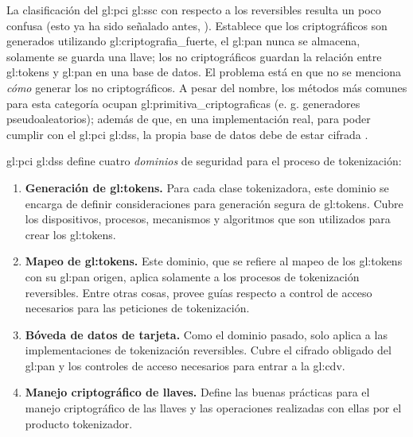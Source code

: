 La clasificación del \gls{gl:pci} \gls{gl:ssc} con respecto a los reversibles
resulta un poco confusa (esto ya ha sido señalado antes, \cite{doc_sandra}).
Establece que los criptográficos son generados utilizando
\gls{gl:criptografia_fuerte}, el \gls{gl:pan} nunca se almacena, solamente se
guarda una llave; los no criptográficos guardan la relación entre
\glspl{gl:token} y \gls{gl:pan} en una base de datos. El problema está en que
no se menciona \textit{cómo} generar los no criptográficos. A pesar del nombre,
los métodos más comunes para esta categoría ocupan
\glspl{gl:primitiva_criptografica} (e. g. generadores pseudoaleatorios); además
de que, en una implementación real, para poder cumplir con el \gls{gl:pci}
\gls{gl:dss}, la propia base de datos debe de estar cifrada \cite{pci_dss}.

\gls{gl:pci} \gls{gl:dss} define cuatro \textit{dominios} de seguridad para el
proceso de tokenización:

\begin{enumerate}

  \item \label{dm:gen_tokens} \textbf{Generación de \glspl{gl:token}.}
    Para cada clase tokenizadora, este dominio se encarga de definir
    consideraciones para generación segura de \glspl{gl:token}. Cubre los
    dispositivos, procesos, mecanismos y algoritmos que son utilizados para
    crear los \glspl{gl:token}.

  \item \label{dm:mapeo_tokens} \textbf{Mapeo de \glspl{gl:token}.}
    Este dominio, que se refiere al mapeo de los \glspl{gl:token} con su
    \gls{gl:pan} origen, aplica solamente a los procesos de tokenización
    reversibles. Entre otras cosas, provee guías respecto a control de acceso
    necesarios para las peticiones de tokenización.

  \item \label{dm:card_data} \textbf{Bóveda de datos de tarjeta.}
    Como el dominio pasado, solo aplica a las implementaciones de tokenización
    reversibles. Cubre el cifrado obligado del \gls{gl:pan} y los controles de
    acceso necesarios para entrar a la \gls{gl:cdv}.

  \item \label{dm:man_llaves} \textbf{Manejo criptográfico de llaves.}
    Define las buenas prácticas para el manejo criptográfico de las llaves y
    las operaciones realizadas con ellas por el producto tokenizador.

\end{enumerate}

